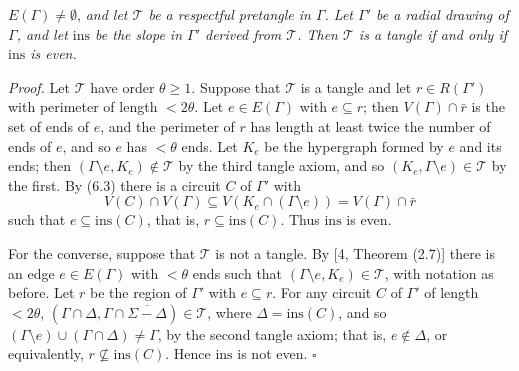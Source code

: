 \noindent $E(\Gamma) \ne \emptyset$, \textit{and let $\mathscr{T}$ be a respectful pretangle in $\Gamma$. Let $\Gamma'$ be a radial drawing of $\Gamma$, and let $\mathrm{ins}$ be the slope in $\Gamma'$ derived from $\mathscr{T}$. Then $\mathscr{T}$ is a tangle if and only if $\mathrm{ins}$ is even.} 

\textit{Proof.} Let $\mathscr{T}$ have order $\theta \ge 1$. Suppose that $\mathscr{T}$ is a tangle and let $r \in R(\Gamma')$ with perimeter of length $< 2\theta$. Let $e \in E(\Gamma)$ with $e \subseteq r$; then $V(\Gamma) \cap \bar{r}$ is the set of ends of $e$, and the perimeter of $r$ has length at least twice the number of ends of $e$, and so $e$ has $< \theta$ ends. Let $K_e$ be the hypergraph formed by $e$ and its ends; then $(\Gamma \setminus e, K_e) \notin \mathscr{T}$ by the third tangle axiom, and so $(K_e, \Gamma \setminus e) \in \mathscr{T}$ by the first. By (6.3) there is a circuit $C$ of $\Gamma'$ with
\begin{equation*}
V(C) \cap V(\Gamma) \subseteq V(K_e \cap (\Gamma \setminus e)) = V(\Gamma) \cap \bar{r}
\end{equation*}
such that $e \subseteq \mathrm{ins}(C)$, that is, $r \subseteq \mathrm{ins}(C)$. Thus $\mathrm{ins}$ is even.

For the converse, suppose that $\mathscr{T}$ is not a tangle. By [4, Theorem (2.7)] there is an edge $e \in E(\Gamma)$ with $< \theta$ ends such that $(\Gamma \setminus e, K_e) \in \mathscr{T}$, with notation as before. Let $r$ be the region of $\Gamma'$ with $e \subseteq r$. For any circuit $C$ of $\Gamma'$ of length $< 2\theta$, $(\Gamma \cap \Delta, \Gamma \cap \overline{\Sigma - \Delta}) \in \mathscr{T}$, where $\Delta = \mathrm{ins}(C)$, and so $(\Gamma \setminus e) \cup (\Gamma \cap \Delta) \ne \Gamma$, by the second tangle axiom; that is, $e \notin \Delta$, or equivalently, $r \nsubseteq \mathrm{ins}(C)$. Hence $\mathrm{ins}$ is not even. $\square$

